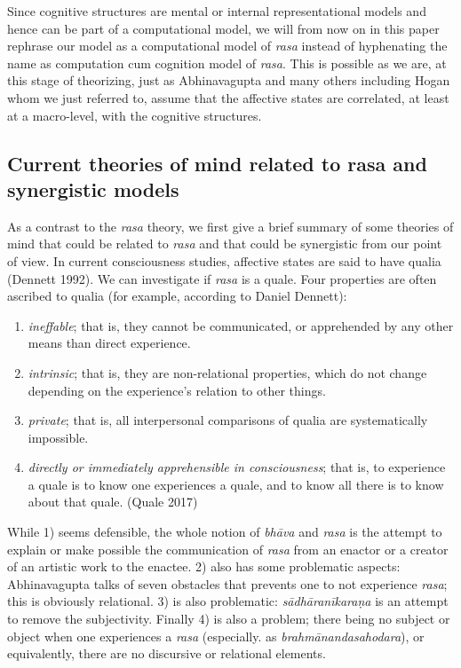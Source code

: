 Since cognitive structures are mental or internal representational models and hence can be part of a computational model, we will from now on in this paper rephrase our model as a computational model of \textsl{rasa} instead of hyphenating the name as computation cum cognition model of \textsl{rasa}. This is possible as we are, at this stage of theorizing, just as Abhinavagupta and many others including Hogan whom we just referred to, assume that the affective states are correlated, at least at a macro-level, with the cognitive structures.

\subsection{Current theories of mind related to rasa and synergistic models}\label{chap7-sec3.1}

As a contrast to the \textsl{rasa} theory, we first give a brief summary of some theories of mind that could be related to \textsl{rasa} and that could be synergistic from our point of view. In current consciousness studies, affective states are said to have qualia (Dennett 1992). We can investigate if \textsl{rasa} is a quale. Four properties are often ascribed to qualia (for example, according to Daniel Dennett): 
\begin{enumerate}
\item \textsl{ineffable}; that is, they cannot be communicated, or apprehended by any other means than direct experience.
\item \textsl{intrinsic}; that is, they are non-relational properties, which do not change depending on the experience's relation to other things.
\item \textsl{private}; that is, all interpersonal comparisons of qualia are systematically impossible.
\item  \textsl{directly or immediately apprehensible in consciousness}; that is, to experience a quale is to know one experiences a quale, and to know all there is to know about that quale. (Quale 2017)
\end{enumerate}

While 1) seems defensible, the whole notion of \textsl{bhāva} and \textsl{rasa} is the attempt to explain or make possible the communication of \textsl{rasa} from an enactor or a creator of an artistic work to the enactee. 2) also has some problematic aspects: Abhinavagupta talks of seven obstacles that prevents one to not experience \textsl{rasa}; this is obviously relational. 3) is also problematic: \textsl{sādhāranīkaraṇa} is an attempt to remove the subjectivity. Finally 4) is also a problem; there being no subject or object when one experiences a \textsl{rasa} (especially. as \textsl{brahmānandasahodara}), or equivalently, there are no discursive or relational elements.

